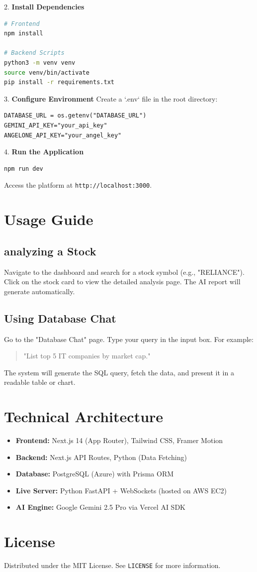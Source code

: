 \documentclass[a4paper,12pt]{article}
\begin{document}
2. \textbf{Install Dependencies}
\begin{lstlisting}[language=bash]
# Frontend
npm install

# Backend Scripts
python3 -m venv venv
source venv/bin/activate
pip install -r requirements.txt
\end{lstlisting}

3. \textbf{Configure Environment}
Create a `.env` file in the root directory:
\begin{lstlisting}
DATABASE_URL = os.getenv("DATABASE_URL")
GEMINI_API_KEY="your_api_key"
ANGELONE_API_KEY="your_angel_key"
\end{lstlisting}

4. \textbf{Run the Application}
\begin{lstlisting}[language=bash]
npm run dev
\end{lstlisting}
Access the platform at \texttt{http://localhost:3000}.

\section{Usage Guide}

\subsection{analyzing a Stock}
Navigate to the dashboard and search for a stock symbol (e.g., "RELIANCE"). Click on the stock card to view the detailed analysis page. The AI report will generate automatically.

\subsection{Using Database Chat}
Go to the "Database Chat" page. Type your query in the input box. For example:
\begin{quote}
    "List top 5 IT companies by market cap."
\end{quote}
The system will generate the SQL query, fetch the data, and present it in a readable table or chart.

\section{Technical Architecture}
\begin{itemize}
    \item \textbf{Frontend:} Next.js 14 (App Router), Tailwind CSS, Framer Motion
    \item \textbf{Backend:} Next.js API Routes, Python (Data Fetching)
    \item \textbf{Database:} PostgreSQL (Azure) with Prisma ORM
    \item \textbf{Live Server:} Python FastAPI + WebSockets (hosted on AWS EC2)
    \item \textbf{AI Engine:} Google Gemini 2.5 Pro via Vercel AI SDK
\end{itemize}

\section{License}
Distributed under the MIT License. See \texttt{LICENSE} for more information.
\end{document}
